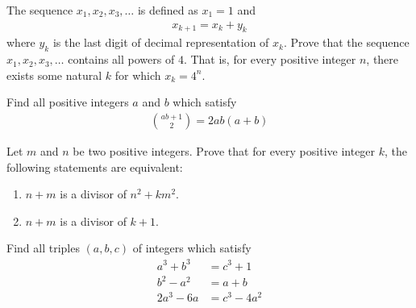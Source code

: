 \begin{problem}
	The sequence $x_1, x_2, x_3, \dots$ is defined as $x_1 = 1$ and
	\begin{align*}
		x_{k+1} = x_k + y_k
	\end{align*}
	where $y_k$ is the last digit of decimal representation of $x_k$. Prove that the sequence $x_1, x_2, x_3, \dots$ contains all powers of $4$. That is, for every positive integer $n$, there exists some natural $k$ for which $x_k=4^n$.
\end{problem}

\begin{problem}
	Find all positive integers $a$ and $b$ which satisfy
	\begin{align*}
		\binom{ab+1}{2} = 2ab(a+b)
	\end{align*}
\end{problem}

\begin{problem}
	Let $m$ and $n$ be two positive integers. Prove that for every positive integer $k$, the following statements are equivalent:
	\begin{enumerate}
		\item $n+m$ is a divisor of $n^2+km^2$.
		\item $n+m$ is a divisor of $k+1$.
	\end{enumerate}
\end{problem}

\begin{problem}
	Find all triples $(a, b, c)$ of integers which satisfy
	\begin{align*}
		a^3 + b^3 &= c^3 + 1\\
		b^2 - a^2 &= a + b\\
		2a^3-6a   &= c^3 - 4a^2
	\end{align*}
\end{problem}

